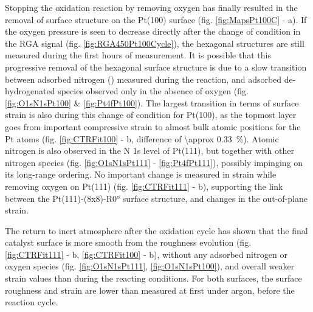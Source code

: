 Stopping the oxidation reaction by removing oxygen has finally resulted in the removal of surface structure on the Pt(100) surface (fig. \ref{fig:MapsPt100C} - a).
If the oxygen pressure is seen to decrease directly after the change of condition in the RGA signal (fig. \ref{fig:RGA450Pt100Cycle}), the hexagonal structures are still measured during the first hours of measurement.
It is possible that this progressive removal of the hexagonal surface structure is due to a slow transition between adsorbed nitrogen () measured during the reaction, and adsorbed de-hydrogenated species observed only in the absence of oxygen (fig. \ref{fig:O1sN1sPt100} \& \ref{fig:Pt4fPt100}).
The largest transition in terms of surface strain is also during this change of condition for Pt(100), as the topmost layer goes from important compressive strain to almost bulk atomic positions for the Pt atoms (fig. \ref{fig:CTRFit100} - b, difference of \qty{\approx 0.33}{\percent}).
Atomic nitrogen is also observed in the N 1s level of Pt(111), but together with other nitrogen species (fig. \ref{fig:O1sN1sPt111} - \ref{fig:Pt4fPt111}), possibly impinging on its long-range ordering.
No important change is measured in strain while removing oxygen on Pt(111) (fig. \ref{fig:CTRFit111} - b), supporting the link between the Pt(111)-(8x8)-R\ang{0} surface structure, and changes in the out-of-plane strain.


The return to inert atmosphere after the oxidation cycle has shown that the final catalyst surface is more smooth from the roughness evolution (fig. \ref{fig:CTRFit111} - b, \ref{fig:CTRFit100} - b), without any adsorbed nitrogen or oxygen species (fig. \ref{fig:O1sN1sPt111}, \ref{fig:O1sN1sPt100}), and overall weaker strain values than during the reacting conditions.
For both surfaces, the surface roughness and strain are lower than measured at first under argon, before the reaction cycle.

